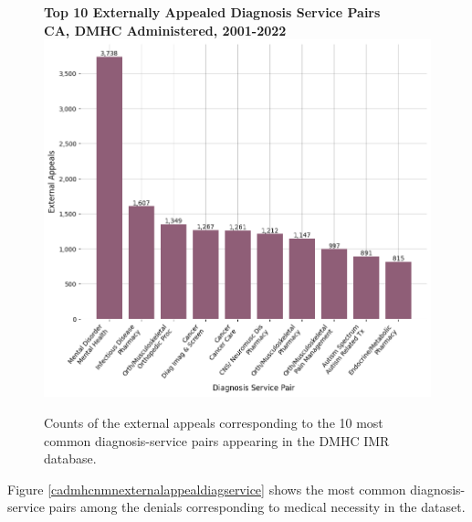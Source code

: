 \documentclass[12pt, a4paper,twoside,parskip=full]{report}
\theoremstyle{plain} %
\theoremstyle{definition} %
\theoremstyle{remark} %
\numberwithin{equation}{chapter}
\begin{document}
		\begin{figure}[h!]
			\centering
			\textbf{Top 10 Externally Appealed Diagnosis Service Pairs}\\
			\textbf{CA, DMHC Administered, 2001-2022}\\
			\includegraphics[width=.8\textwidth]{images/ca_dmhc_external_appeals/top_appealed_diag_services.png}
			\caption{Counts of the external appeals corresponding to the 10 most common diagnosis-service pairs appearing in the DMHC IMR database.}
			\label{cadmhcexternalappealsbydiagservice}
		\end{figure}
		\clearpage
		
		
		Figure \ref{cadmhcnmnexternalappealdiagservice} shows the most common diagnosis-service pairs among the denials corresponding to medical necessity in the dataset.
		
\end{document}
